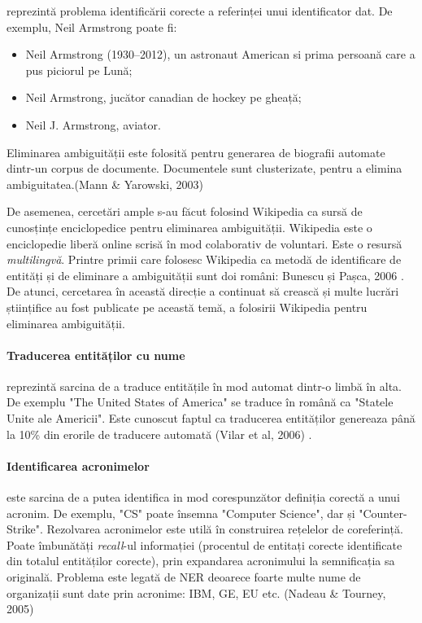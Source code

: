 reprezintă problema identificării corecte a referinței unui identificator dat. De exemplu, Neil Armstrong poate fi:

\begin{itemize}
\item Neil Armstrong (1930–2012), un astronaut American si prima persoană care a pus piciorul pe Lună;
\item Neil Armstrong, jucător canadian de hockey pe gheață;
\item Neil J. Armstrong, aviator.
\end{itemize}

Eliminarea ambiguității este folosită pentru generarea de biografii automate dintr-un corpus de documente. Documentele sunt clusterizate, pentru a elimina ambiguitatea.(Mann \& Yarowski, 2003)\cite{Mann03unsupervisedpersonal}

De asemenea, cercetări ample s-au făcut folosind Wikipedia ca sursă de cunosțințe enciclopedice pentru eliminarea ambiguității. Wikipedia este o enciclopedie liberă online scrisă în mod colaborativ de voluntari. Este o resursă \textit{multilingvă}. Printre primii care folosesc Wikipedia ca metodă de identificare de entități și de eliminare a ambiguității sunt doi români: Bunescu și Pașca, 2006 \cite{Bunescu06usingencyclopedic}. De atunci, cercetarea în această direcție a continuat să crească și multe lucrări științifice au fost publicate pe această temă, a folosirii Wikipedia pentru eliminarea ambiguității.

\paragraph{Traducerea entităților cu nume}

reprezintă sarcina de a traduce entitățile în mod automat dintr-o limbă în alta. De exemplu "The United States of America" se traduce în română ca "Statele Unite ale Americii". Este cunoscut faptul ca traducerea entităților genereaza până la 10\% din erorile de traducere automată (Vilar et al, 2006) \cite{vilar2006}.

\paragraph{Identificarea acronimelor}

este sarcina de a putea identifica in mod corespunzător definiția corectă a unui acronim. De exemplu, "CS" poate însemna "Computer Science", dar și "Counter-Strike". Rezolvarea  acronimelor este utilă în construirea rețelelor de coreferință. Poate îmbunătăți \textit{recall}-ul informației (procentul de entitați corecte identificate din totalul entităților corecte), prin expandarea acronimului la semnificația sa originală. Problema este legată de NER deoarece foarte multe nume de organizații sunt date prin acronime: IBM, GE, EU etc. (Nadeau \& Tourney, 2005)\cite{Nadeau05asupervised}

